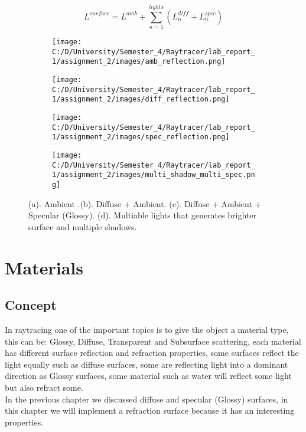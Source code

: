 \documentclass{article}
\begin{document}
\begin{equation}
	L^{surface}= L^{amb} + \sum_{n=1}^{lights} (L_n^{diff} + L_n^{spec})
\end{equation}



\begin{figure}[ht]
	\begin{subfigure}{.3\textwidth}
		\centering
		\texttt{[image: C:/D/University/Semester\_4/Raytracer/lab\_report\_1/assignment\_2/images/amb\_reflection.png]}  
		\caption{}
		\label{fig:sub-first}
	\end{subfigure}
	\begin{subfigure}{.3\textwidth}
		\centering
		\texttt{[image: C:/D/University/Semester\_4/Raytracer/lab\_report\_1/assignment\_2/images/diff\_reflection.png]}  
		\caption{}
		\label{fig:sub-second}
	\end{subfigure}
	\begin{subfigure}{.3\textwidth}
		\centering
		\texttt{[image: C:/D/University/Semester\_4/Raytracer/lab\_report\_1/assignment\_2/images/spec\_reflection.png]}  
		\caption{}
		\label{fig:sub-third}
	\end{subfigure}
	
			\begin{subfigure}{.3\textwidth}
		\centering
		\texttt{[image: C:/D/University/Semester\_4/Raytracer/lab\_report\_1/assignment\_2/images/multi\_shadow\_multi\_spec.png]}  
		\caption{}
		\label{fig:sub-third}
	\end{subfigure}
	\caption{(a). Ambient .(b). Diffuse + Ambient. (c). Diffuse + Ambient + Specular (Glossy). (d). Multiable lights that generates brighter surface and multiple shadows.}
	\label{fig:fig}
\end{figure}


\section{Materials}
	      \subsection{Concept}
	      In raytracing one of the important topics is to give the object a material type, this can be: Glossy, Diffuse, Transparent and Subsurface
	      scattering, each material has different surface reflection and refraction properties, some surfaces reflect the light equally such as diffuse surfaces, some are reflecting light into a dominant direction as Glossy surfaces, some material such as water will reflect some light but also refract some.
	      \\ 
	      In the previous chapter we discussed diffuse and specular (Glossy) surfaces, in this chapter we will implement a refraction surface because it has an interesting properties. 
	      
\end{document}
